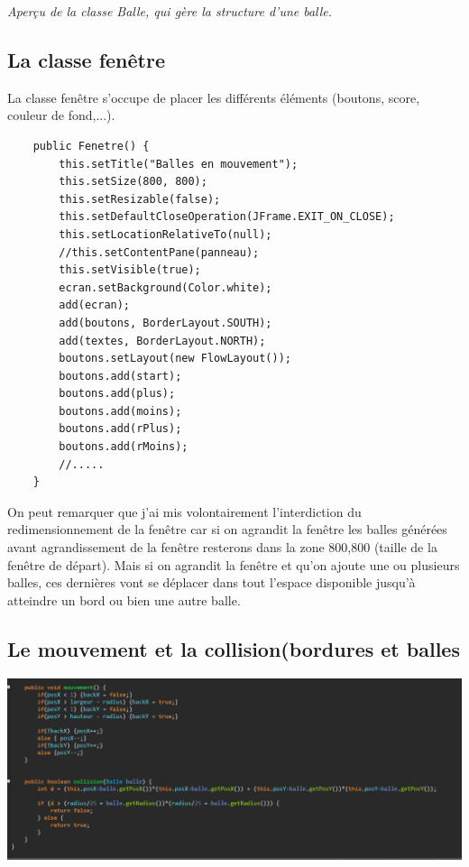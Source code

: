 \documentclass{article}
\begin{document}
\begin{center}
  	\textsl{Aperçu de la classe Balle, qui gère la structure d'une balle.}
\end{center}

\newpage
	\subsection{La classe fenêtre}
La classe fenêtre s'occupe de placer les différents éléments (boutons, score, couleur de fond,...). 

\begin{verbatim}
	public Fenetre() {
		this.setTitle("Balles en mouvement");
	    this.setSize(800, 800);
	    this.setResizable(false);
	    this.setDefaultCloseOperation(JFrame.EXIT_ON_CLOSE);
	    this.setLocationRelativeTo(null);
	    //this.setContentPane(panneau);
	    this.setVisible(true);
	    ecran.setBackground(Color.white);
	    add(ecran);
	    add(boutons, BorderLayout.SOUTH);
	    add(textes, BorderLayout.NORTH);
	    boutons.setLayout(new FlowLayout());
	    boutons.add(start);
	    boutons.add(plus);
	    boutons.add(moins);
	    boutons.add(rPlus);
	    boutons.add(rMoins);
	   	//.....
	}	   
\end{verbatim}

On peut remarquer que j'ai mis volontairement l'interdiction du redimensionnement de la fenêtre car si on agrandit la fenêtre les balles générées avant agrandissement de la fenêtre resterons dans la zone 800,800 (taille de la fenêtre de départ). 
\newline
Mais si on agrandit la fenêtre et qu'on ajoute une ou plusieurs balles, ces dernières vont se déplacer dans tout l'espace disponible jusqu'à atteindre un bord ou bien une autre balle.
\newline

\subsection{Le mouvement et la collision(bordures et balles}

\begin{center}
\includegraphics[scale=0.5]{Mouvement_Collision.png}
\end{center}
\end{document}
